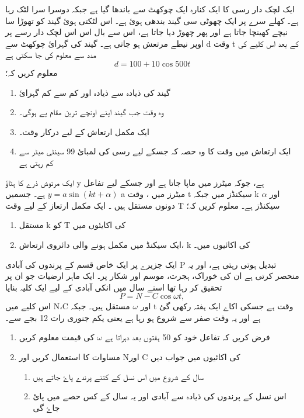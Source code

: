 ایک لچک دار رسی کا ایک کنارہ ایک چوکھٹ سے باندھا گیا ہے جبکہ دوسرا سرا لٹک رہا ہے۔ کھلے سرے پر ایک چھوٹی سی گیند بندھی ہوئ ہے۔ اس لٹکتی ہوئ گیند کو تھوڑا سا نیچے کھینچا جاتا ہے اور پھر چھوڑ دیا جاتا ہے، اس سے بال اس اس لچک دار رسے پر اوپر نیطے مرتعش ہو جاتی ہے۔ گیند کی گہرائ چوکھٹ سے   d وقت t کے بعد اس کلیے کی مدد سے معلوم کی جا سکتی ہے
\[d=100+10\cos500t\]
معلوم کریں کہ؛
\begin{enumerate}
\item   گیند کی ذیادہ سے ذیادہ اور کم سے کم گہرائ
\item  وہ وقت جب گیند اپنے اونچے ترین مقام پے ہوگی۔
\item   ایک مکمل ارتعاش کے لیے درکار وقت۔
\item  ایک ارتعاش میں  وقت کا وہ حصہ کہ جسکے لیے رسی کی لمبائ 99 سینٹی میٹر سے کم رہتی ہے 
\end{enumerate}
ایک مرتوش ذرے کا ہٹاؤ y ہے، جوکہ میٹرز میں ماپا جاتا ہے اور جسکے لیے تفاعل  \(y=a\sin(kt+\alpha) \) ہے۔ جسمیں a میٹرز میں ، وقت t سیکنڈز میں جبکہ k اور \(\alpha \) دونوں مستقل ہیں ۔ ایک مکمل ارتعاز کے لیے وقت   T  سیکنڈز ہے۔
معلوم کریں کہ؛
\begin{enumerate}
\item   مستقل   k کو  T  کی اکایئوں میں
\item   ایک سیکنڈ میں مکمل ہونے والی دائروی ارتعاش،   k کی اکائیوں میں۔
\end{enumerate}


ایک جزیرے پر ایک خاص قسم کے پرندوں کی آبادی P تبدیل ہوتی رہتی ہے، اور یہ منحصر کرتی ہے ان کی خوراک، ہجرت، موسم اور شکار پر۔ ایک ماہر ارضیات جو ان پر تحقیق کر رہا تھا اسنے سال میں انکی آبادی کے لیے ایک کلیہ بنایا  \[P=N-C\cos\omega t, \]
اس کلیے میں N،C اور \(\omega \)   مستقل   ہیں۔ جبکہ   t   وقت ہے جسکی اکاے ایک ہفتہ رکھی گئ ہے اور یہ وقت صفر سے شروع ہو رہا ہے یعنی یکم جنوری رات 12 بجے سے۔
\begin{enumerate}
\item  
   فرض کریں کہ تفاعل خود کو 50 ہفتوں بعد دہراتا ہے   \(\omega \)    کی قیمت معلوم کریں
\item
مساوات کا استعمال کریں اور Nاور  C  کی اکائیوں میں جواب دیں
\begin{enumerate} 
\item 
سال کے شروع میں  اس نسل کے کتنے پرندے پاۓ جاتے ہیں 
\item
اس نسل کے پرندوں کی ذیادہ سے آبادی اور یہ سال کے کس حصے میں پائ جاۓ گی
\end{enumerate}
\end{enumerate}

